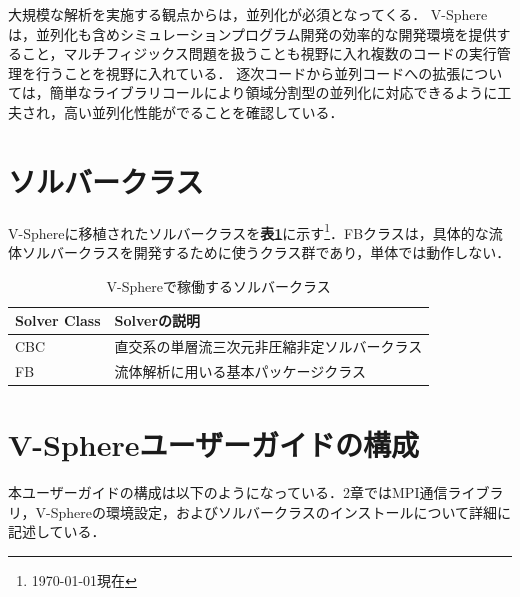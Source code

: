 大規模な解析を実施する観点からは，並列化が必須となってくる．
V-Sphereは，並列化も含めシミュレーションプログラム開発の効率的な開発環境を提供すること，マルチフィジックス問題を扱うことも視野に入れ複数のコードの実行管理を行うことを視野に入れている．
逐次コードから並列コードへの拡張については，簡単なライブラリコールにより領域分割型の並列化に対応できるように工夫され，高い並列化性能がでることを確認している．

%
\section{ソルバークラス}
\label{sec:1.2}
V-Sphereに移植されたソルバークラスを\textbf{表\ref{tbl:solverclass}}に示す\footnote{\today 現在}．FBクラスは，具体的な流体ソルバークラスを開発するために使うクラス群であり，単体では動作しない．

\begin{table}[htdp]
\caption{V-Sphereで稼働するソルバークラス}
\small
\begin{center}
\begin{tabular}{ll} \toprule
Solver Class & Solverの説明\\ \midrule
CBC & 直交系の単層流三次元非圧縮非定ソルバークラス\\
FB & 流体解析に用いる基本パッケージクラス\\ \bottomrule
\end{tabular}
\end{center}
\label{tbl:solverclass}
\end{table}

%
\section{V-Sphereユーザーガイドの構成}
\label{sec:1.3}
本ユーザーガイドの構成は以下のようになっている．2章ではMPI通信ライブラリ，V-Sphereの環境設定，およびソルバークラスのインストールについて詳細に記述している．
